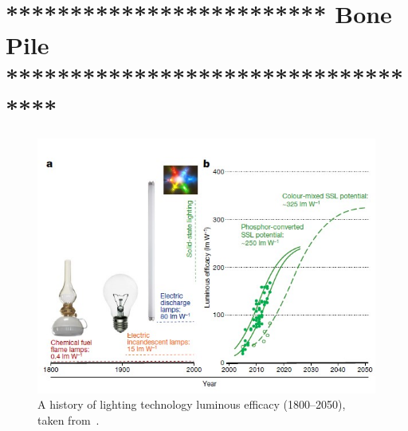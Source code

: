 

\section{************************* Bone Pile ***********************************}

\begin{figure}
\centering
\includegraphics[width=1\linewidth]{figure_other/history_efficacy.jpg}
\caption{A history of lighting technology luminous efficacy (1800--2050),
          taken from~\citet{Pattison2018LEDphotons}.}
\label{fig:history_efficacy}
\end{figure}





















